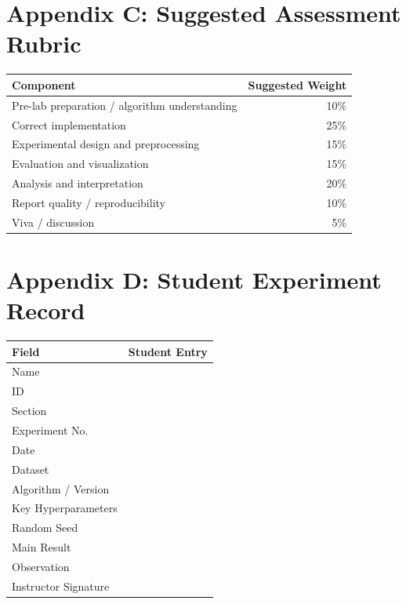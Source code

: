 \chapter*{Appendix C: Suggested Assessment Rubric}
{}

\begin{longtable}{|p{}|r|}
\hline
\rowcolor{mlblue!8}\textbf{Component} & \textbf{Suggested Weight} \\
\hline
\endhead
Pre-lab preparation / algorithm understanding & 10\% \\
\hline
Correct implementation & 25\% \\
\hline
Experimental design and preprocessing & 15\% \\
\hline
Evaluation and visualization & 15\% \\
\hline
Analysis and interpretation & 20\% \\
\hline
Report quality / reproducibility & 10\% \\
\hline
Viva / discussion & 5\% \\
\hline
\end{longtable}

\chapter*{Appendix D: Student Experiment Record}
{}

\begin{longtable}{|p{}|p{}|}
\hline
\rowcolor{mlblue!8}\textbf{Field} & \textbf{Student Entry} \\
\hline
\endhead
Name & \\
\hline
ID & \\
\hline
Section & \\
\hline
Experiment No. & \\
\hline
Date & \\
\hline
Dataset & \\
\hline
Algorithm / Version & \\
\hline
Key Hyperparameters & \\
\hline
Random Seed & \\
\hline
Main Result & \\
\hline
Observation & \\
\hline
Instructor Signature & \\
\hline
\end{longtable}
